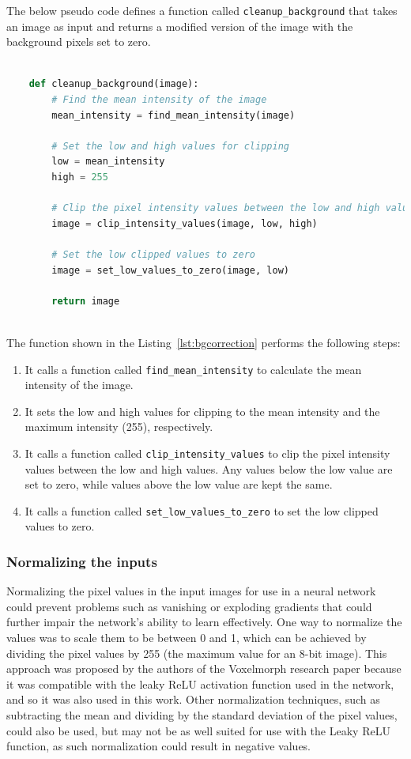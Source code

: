 \documentclass{book}
\begin{document}
	The below pseudo code defines a function called \texttt{cleanup\_background} that takes an image as input and returns a modified version of the image with the background pixels set to zero.
	
	\begin{lstlisting}[language=python, label=lst:bgcorrection, caption=Pseudo function to show the background noise removal in an image.]

	def cleanup_background(image):
		# Find the mean intensity of the image
		mean_intensity = find_mean_intensity(image)
	
		# Set the low and high values for clipping
		low = mean_intensity
		high = 255
	
		# Clip the pixel intensity values between the low and high values
		image = clip_intensity_values(image, low, high)
	
		# Set the low clipped values to zero
		image = set_low_values_to_zero(image, low)
	
		return image
	
	\end{lstlisting}	
	
	The function shown in the Listing~\ref{lst:bgcorrection} performs the following steps:
	
	\begin{enumerate}
		\item It calls a function called \texttt{find\_mean\_intensity} to calculate the mean intensity of the image.
		\item It sets the low and high values for clipping to the mean intensity and the maximum intensity (255), respectively.
		\item It calls a function called \texttt{clip\_intensity\_values} to clip the pixel intensity values between the low and high values. Any values below the low value are set to zero, while values above the low value are kept the same.
		\item It calls a function called \texttt{set\_low\_values\_to\_zero} to set the low clipped values to zero.
	\end{enumerate}
	
	\subsubsection{Normalizing the inputs}
	Normalizing the pixel values in the input images for use in a neural network could prevent problems such as vanishing or exploding gradients that could further impair the network's ability to learn effectively. One way to normalize the values was to scale them to be between 0 and 1, which can be achieved by dividing the pixel values by 255 (the maximum value for an 8-bit image). This approach was proposed by the authors of the Voxelmorph research paper because it was compatible with the leaky ReLU activation function used in the network, and so it was also used in this work. Other normalization techniques, such as subtracting the mean and dividing by the standard deviation of the pixel values, could also be used, but may not be as well suited for use with the Leaky ReLU function, as such normalization could result in negative values.
	
\end{document}
